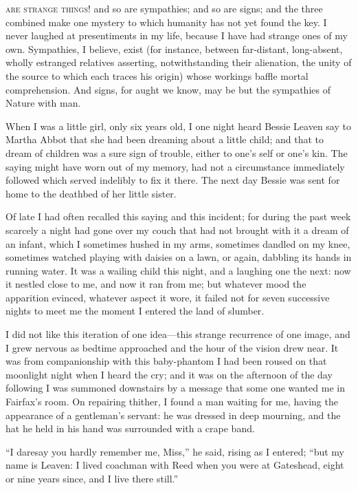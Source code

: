 
 \textsc{are strange things!} and so are sympathies; and so are
signs; and the three combined make one mystery to which humanity has not
yet found the key. I never laughed at presentiments in my life, because
I have had strange ones of my own. Sympathies, I believe, exist (for
instance, between far-distant, long-absent, wholly estranged relatives
asserting, notwithstanding their alienation, the unity of the source to
which each traces his origin) whose workings baffle mortal
comprehension. And signs, for aught we know, may be but the sympathies
of Nature with man.

When I was a little girl, only six years old, I one night heard Bessie
Leaven say to Martha Abbot that she had been dreaming about a little
child; and that to dream of children was a sure sign of trouble, either
to one's self or one's kin. The saying might have worn out of my
memory, had not a circumstance immediately followed which served
indelibly to fix it there. The next day Bessie was sent for home to the
deathbed of her little sister.

Of late I had often recalled this saying and this incident; for during
the past week scarcely a night had gone over my couch that had not
brought with it a dream of an infant, which I sometimes hushed in my
arms, sometimes dandled on my knee, sometimes watched playing with
daisies on a lawn, or again, dabbling its hands in running water. It
was a wailing child this night, and a laughing one the next: now it
nestled close to me, and now it ran from me; but whatever mood the
apparition evinced, whatever aspect it wore, it failed not for seven
successive nights to meet me the moment I entered the land of slumber.

I did not like this iteration of one idea---this strange recurrence of
one image, and I grew nervous as bedtime approached and the hour of the
vision drew near. It was from companionship with this baby-phantom I
had been roused on that moonlight night when I heard the cry; and it was
on the afternoon of the day following I was summoned downstairs by a
message that some one wanted me in \Mrs{} Fairfax's room. On repairing
thither, I found a man waiting for me, having the appearance of a
gentleman's servant: he was dressed in deep mourning, and the hat he
held in his hand was surrounded with a crape band.

\enquote{I daresay you hardly remember me, Miss,} he said, rising as I
entered; \enquote{but my name is Leaven: I lived coachman with \Mrs{} Reed
when you were at Gateshead, eight or nine years since, and I live there
still.}


